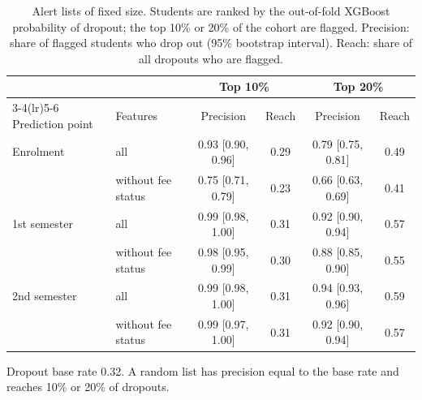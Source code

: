 \begin{table}[H]
\centering
\small
\setlength{\tabcolsep}{4pt}
\caption{Alert lists of fixed size. Students are ranked by the out-of-fold XGBoost probability of dropout; the top 10\% or 20\% of the cohort are flagged. Precision: share of flagged students who drop out (95\% bootstrap interval). Reach: share of all dropouts who are flagged.}
\label{tab:alerts}
\begin{tabular}{llcccc}
\toprule
 & & \multicolumn{2}{c}{Top 10\%} & \multicolumn{2}{c}{Top 20\%} \\
\cmidrule(lr){3-4}\cmidrule(lr){5-6}
Prediction point & Features & Precision & Reach & Precision & Reach \\
\midrule
Enrolment & all & 0.93 [0.90, 0.96] & 0.29 & 0.79 [0.75, 0.81] & 0.49 \\
 & without fee status & 0.75 [0.71, 0.79] & 0.23 & 0.66 [0.63, 0.69] & 0.41 \\
1st semester & all & 0.99 [0.98, 1.00] & 0.31 & 0.92 [0.90, 0.94] & 0.57 \\
 & without fee status & 0.98 [0.95, 0.99] & 0.30 & 0.88 [0.85, 0.90] & 0.55 \\
2nd semester & all & 0.99 [0.98, 1.00] & 0.31 & 0.94 [0.93, 0.96] & 0.59 \\
 & without fee status & 0.99 [0.97, 1.00] & 0.31 & 0.92 [0.90, 0.94] & 0.57 \\
\bottomrule
\end{tabular}
\par\smallskip\footnotesize Dropout base rate 0.32. A random list has precision equal to the base rate and reaches 10\% or 20\% of dropouts.
\end{table}
